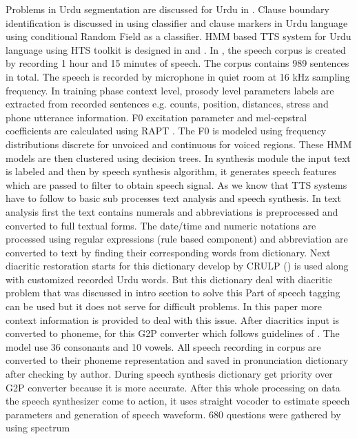 Problems in Urdu segmentation are discussed for Urdu in \cite{durrani2010urdu}. Clause boundary identification is discussed in 
\cite{parveen2011clause} using classifier
and clause markers in Urdu language using conditional Random Field as a classifier. HMM based TTS system for
Urdu language using HTS toolkit is designed in \cite{ahmed2014hmm} and \cite{nawaz2014hidden}. In \cite{ahmed2014hmm}, the speech corpus is created by recording 1 hour and 15 minutes of speech. The corpus contains 989 sentences in total. The speech is recorded by microphone in quiet room at 16 kHz sampling frequency. In training phase context level, prosody level parameters labels are extracted from recorded sentences e.g. counts, position, distances, stress and phone utterance information. F0 excitation parameter and mel-cepstral coefficients are calculated using RAPT \cite{kleijn1995speech}. The F0 is modeled using frequency
distributions discrete for unvoiced and continuous for voiced regions. These HMM models are then clustered using decision
trees. In synthesis module the input text is labeled and then by speech synthesis algorithm, it generates speech features which
are passed to filter to obtain speech signal. As we know that TTS systems have to follow to basic sub processes text analysis
and speech synthesis. In text analysis first the text contains numerals and abbreviations is preprocessed and converted to full
textual forms. The date/time and numeric notations are processed using regular expressions (rule based component) and
abbreviation are converted to text by finding their corresponding words from dictionary. Next diacritic restoration starts for
this dictionary develop by CRULP (\cite{crulp}) is used along with customized recorded Urdu words. But this dictionary
deal with diacritic problem that was discussed in intro section to solve this Part of speech tagging can be used but it does not
serve for difficult problems. In this paper more context information is provided to deal with this issue. After diacritics input is
converted to phoneme, for this G2P converter which follows guidelines of \cite{hussain2004sound}. The model use 36
consonants and 10 vowels. All speech recording in corpus are converted to their phoneme representation and saved in
pronunciation dictionary after checking by author. During speech synthesis dictionary get priority over G2P converter
because it is more accurate. After this whole processing on data the speech synthesizer come to action, it uses straight
vocoder to estimate speech parameters and generation of speech waveform. 680 questions were gathered by using spectrum
